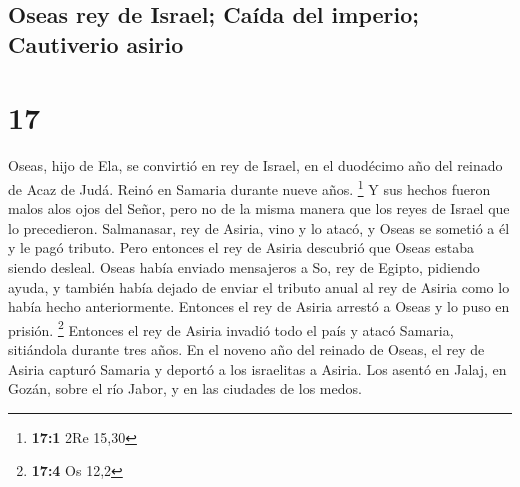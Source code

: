 \hypertarget{oseas-rey-de-israel-cauxedda-del-imperio-cautiverio-asirio}{%
\subsection{Oseas rey de Israel; Caída del imperio; Cautiverio
asirio}\label{oseas-rey-de-israel-cauxedda-del-imperio-cautiverio-asirio}}

\hypertarget{section-16}{%
\section{17}\label{section-16}}

 Oseas, hijo de Ela, se convirtió en rey de Israel, en el
duodécimo año del reinado de Acaz de Judá. Reinó en Samaria durante
nueve años. \footnote{\textbf{17:1} 2Re 15,30}  Y sus
hechos fueron malos alos ojos del Señor, pero no de la misma manera que
los reyes de Israel que lo precedieron.  Salmanasar, rey
de Asiria, vino y lo atacó, y Oseas se sometió a él y le pagó tributo.
 Pero entonces el rey de Asiria descubrió que Oseas estaba
siendo desleal. Oseas había enviado mensajeros a So, rey de Egipto,
pidiendo ayuda, y también había dejado de enviar el tributo anual al rey
de Asiria como lo había hecho anteriormente. Entonces el rey de Asiria
arrestó a Oseas y lo puso en prisión. \footnote{\textbf{17:4} Os 12,2}
 Entonces el rey de Asiria invadió todo el país y atacó
Samaria, sitiándola durante tres años.  En el noveno año
del reinado de Oseas, el rey de Asiria capturó Samaria y deportó a los
israelitas a Asiria. Los asentó en Jalaj, en Gozán, sobre el río Jabor,
y en las ciudades de los medos.

